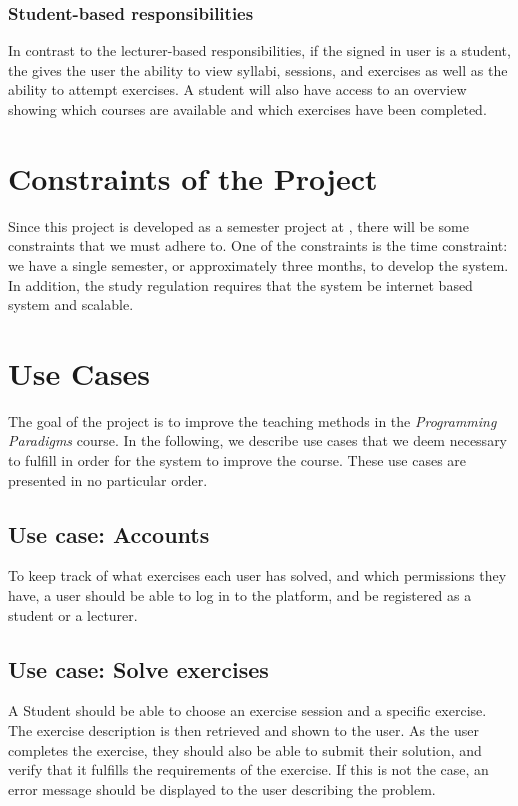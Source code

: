 \subsubsection*{Student-based responsibilities}
In contrast to the lecturer-based responsibilities, if the signed in user is a student, the \frontend{} gives the user the ability to view syllabi, sessions, and exercises as well as the ability to attempt exercises. A student will also have access to an overview showing which courses are available and which exercises have been completed.

\section*{Constraints of the Project}
Since this project is developed as a semester project at \aau{}, there will be some constraints that we must adhere to.
One of the constraints is the time constraint: we have a single semester, or approximately three months, to develop the system.
In addition, the study regulation requires that the system be internet based system and scalable.

\section*{Use Cases} \label{sec:use_cases}
The goal of the project is to improve the teaching methods in the \textit{Programming Paradigms} course.
In the following, we describe use cases that we deem necessary to fulfill in order for the system to improve the course.
These use cases are presented in no particular order.

\subsection*{Use case: Accounts}
To keep track of what exercises each user has solved, and which permissions they have, a user should be able to log in to the platform, and be registered as a student or a lecturer.

\subsection*{Use case: Solve exercises}
A Student should be able to choose an exercise session and a specific exercise. The exercise description is then retrieved and shown to the user.
As the user completes the exercise, they should also be able to submit their solution, and verify that it fulfills the requirements of the exercise. If this is not the case, an error message should be displayed to the user describing the problem.

